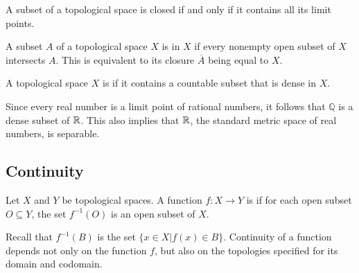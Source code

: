 \begin{theorem}
A subset of a topological space is closed if and only if it contains all its limit points.
\end{theorem}

\begin{definition}
A subset $A$ of a topological space $X$ is  in $X$ if every nonempty open subset of $X$ intersects $A$.
This is equivalent to its closure $\overline{A}$ being equal to $X$.
\end{definition}

\begin{definition}
A topological space $X$ is  if it contains a countable subset that is dense in $X$.
\end{definition}

\begin{example}
Since every real number is a limit point of rational numbers, it follows that $\mathbb{Q}$ is a dense subset of $\mathbb{R}$.
This also implies that $\mathbb{R}$, the standard metric space of real numbers, is separable.
\end{example}


\subsection{Continuity}

\begin{definition}
Let $X$ and $Y$ be topological spaces.
A function $f \colon X \rightarrow Y$ is  if for each open subset $O \subseteq Y$, the set $f^{-1} (O)$ is an open subset of $X$.
\end{definition}

Recall that $f^{-1}(B)$ is the set $\{ x \in X | f(x) \in B \}$.
Continuity of a function depends not only on the function $f$, but also on the topologies specified for its domain and codomain.

